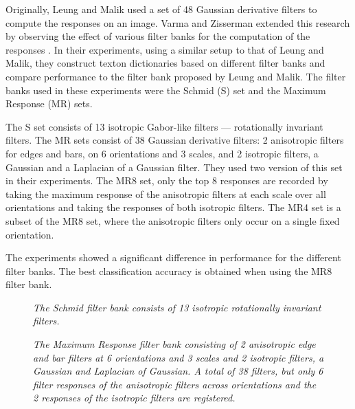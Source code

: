 Originally, Leung and Malik used a set of 48 Gaussian derivative filters to compute the responses on an image. Varma and Zisserman extended this research by observing the effect of various filter banks for the computation of the responses \cite{VarmaZisserman}. In their experiments, using a similar setup to that of Leung and Malik, they construct texton dictionaries based on different filter banks and compare performance to the filter bank proposed by Leung and Malik. The filter banks used in these experiments were the Schmid (S) set and the Maximum Response (MR) sets. 

The S set consists of 13 isotropic Gabor-like filters --- rotationally invariant filters. The MR sets consist of 38 Gaussian derivative filters: 2 anisotropic filters for edges and bars, on 6 orientations and 3 scales, and 2 isotropic filters, a Gaussian and a Laplacian of a Gaussian filter. They used two version of this set in their experiments. The MR8 set, only the top 8 responses are recorded by taking the maximum response of the anisotropic filters at each scale over all orientations and taking the responses of both isotropic filters. The MR4 set is a subset of the MR8 set, where the anisotropic filters only occur on a single fixed orientation.

The experiments showed a significant difference in performance for the different filter banks. The best classification accuracy is obtained when using the MR8 filter bank.

\begin{figure}[t]
	\begin{center}
	\end{center}
	\caption{\textit{The Schmid filter bank consists of 13 isotropic rotationally invariant filters.}}
	\label{fig:S}
\end{figure}

\begin{figure}[b]
	\begin{center}
	\end{center}
	\caption{\textit{The Maximum Response filter bank consisting of 2 anisotropic edge and bar filters at 6 orientations and 3 scales and 2 isotropic filters, a Gaussian and Laplacian of Gaussian. A total of 38 filters, but only 6 filter responses of the anisotropic filters across orientations and the 2 responses of the isotropic filters are registered.}}
	\label{fig:MR}
\end{figure}


